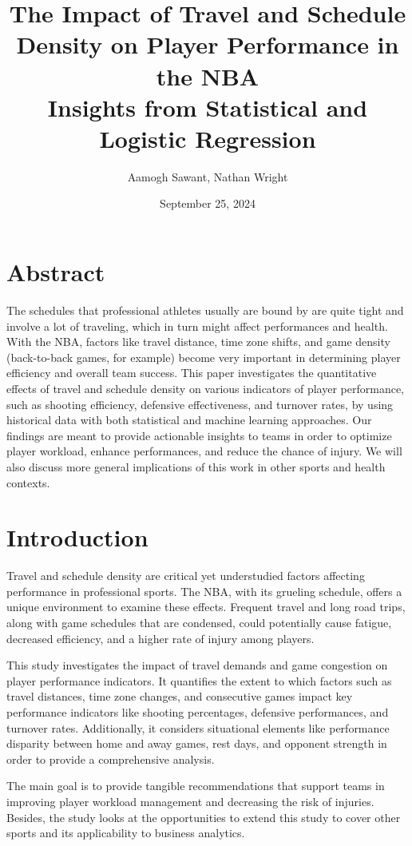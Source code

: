 \documentclass[12pt]{article}
\title{\Huge \textbf{The Impact of Travel and Schedule Density on Player Performance in the NBA}\\
\LARGE Insights from Statistical and Logistic Regression}
\author{
  Aamogh Sawant, 
  Nathan Wright
}
\date{September 25, 2024}
\begin{document}
\maketitle

\newpage
\tableofcontents
\newpage

\section{Abstract}
The schedules that professional athletes usually are bound by are quite tight and involve a lot of traveling, which in turn might affect performances and health. With the NBA, factors like travel distance, time zone shifts, and game density (back-to-back games, for example) become very important in determining player efficiency and overall team success. This paper investigates the quantitative effects of travel and schedule density on various indicators of player performance, such as shooting efficiency, defensive effectiveness, and turnover rates, by using historical data with both statistical and machine learning approaches. Our findings are meant to provide actionable insights to teams in order to optimize player workload, enhance performances, and reduce the chance of injury. We will also discuss more general implications of this work in other sports and health contexts.

\section{Introduction}
Travel and schedule density are critical yet understudied factors affecting performance in professional sports. The NBA, with its grueling schedule, offers a unique environment to examine these effects. Frequent travel and long road trips, along with game schedules that are condensed, could potentially cause fatigue, decreased efficiency, and a higher rate of injury among players.

This study investigates the impact of travel demands and game congestion on player performance indicators. It quantifies the extent to which factors such as travel distances, time zone changes, and consecutive games impact key performance indicators like shooting percentages, defensive performances, and turnover rates. Additionally, it considers situational elements like performance disparity between home and away games, rest days, and opponent strength in order to provide a comprehensive analysis.

The main goal is to provide tangible recommendations that support teams in improving player workload management and decreasing the risk of injuries. Besides, the study looks at the opportunities to extend this study to cover other sports and its applicability to business analytics.
\end{document}
